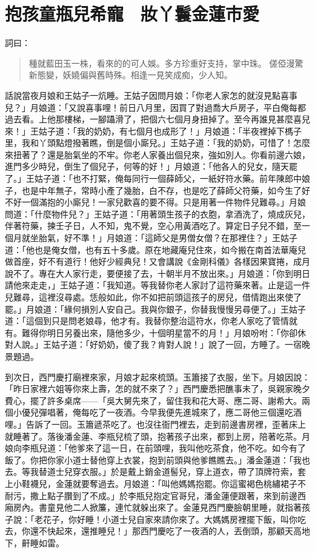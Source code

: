 
\chapter{抱孩童瓶兒希寵　妝丫鬟金蓮市愛}

詞曰：
\begin{quote}
種就藍田玉一株，看來的的可人娛。多方珍重好支持，掌中珠。
傞俹漫驚新態變，妖嬈偏與舊時殊。相逢一見笑成痴，少人知。
\end{quote}

話說當夜月娘和王姑子一炕睡。王姑子因問月娘：「你老人家怎的就沒見點喜事兒？」月娘道：「又說喜事哩！前日八月里，因買了對過喬大戶房子，平白俺每都過去看。上他那樓梯，一腳躡滑了，把個六七個月身扭掉了。至今再誰見甚麼喜兒來！」王姑子道：「我的奶奶，有七個月也成形了！」月娘道：「半夜裡掉下榪子里，我和丫頭點燈撥著瞧，倒是個小廝兒。」王姑子道：「我的奶奶，可惜了！怎麼來扭著了？還是胎氣坐的不牢。你老人家養出個兒來，強如別人。你看前邊六娘，進門多少時兒，倒生了個兒子，何等的好！」月娘道：「他各人的兒女，隨天罷了。」王姑子道：「也不打緊，俺每同行一個薛師父，一紙好符水藥。前年陳郎中娘子，也是中年無子，常時小產了幾胎，白不存，也是吃了薛師父符藥，如今生了好不好一個滿抱的小廝兒！一家兒歡喜的要不得。只是用著一件物件兒難尋。」月娘問道：「什麼物件兒？」王姑子道：「用著頭生孩子的衣胞，拿酒洗了，燒成灰兒，伴著符藥，揀壬子日，人不知，鬼不覺，空心用黃酒吃了。算定日子兒不錯，至一個月就坐胎氣，好不準！」月娘道：「這師父是男僧女僧？在那裡住？」王姑子道：「他也是俺女僧，也有五十多歲。原在地藏庵兒住來，如今搬在南首法華庵兒做首座，好不有道行！他好少經典兒！又會講說《金剛科儀》各樣因果寶捲，成月說不了。專在大人家行走，要便接了去，十朝半月不放出來。」月娘道：「你到明日請他來走走，」王姑子道：「我知道。等我替你老人家討了這符藥來著。止是這一件兒難尋，這裡沒尋處。恁般如此，你不如把前頭這孩子的房兒，借情跑出來使了罷。」月娘道：「緣何損別人安自己。我與你銀子，你替我慢慢另尋便了。」王姑子道：「這個到只是問老娘尋，他才有。我替你整治這符水，你老人家吃了管情就有。難得你明日另養出來，隨他多少，十個明星當不的月！」月娘吩咐：「你卻休對人說。」王姑子道：「好奶奶，傻了我？肯對人說！」說了一回，方睡了。一宿晚景題過。

到次日，西門慶打廟裡來家，月娘才起來梳頭。玉簫接了衣服，坐下。月娘因說：「昨日家裡六姐等你來上壽，怎的就不來了？」西門慶悉把醮事未了，吳親家晚夕費心，擺了許多桌席——「吳大舅先來了，留住我和花大哥、應二哥、謝希大。兩個小優兒彈唱著，俺每吃了一夜酒。今早我便先進城來了，應二哥他三個還吃酒哩。」告訴了一回。玉簫遞茶吃了。也沒往衙門裡去，走到前邊書房裡，歪著床上就睡著了。落後潘金蓮、李瓶兒梳了頭，抱著孩子出來，都到上房，陪著吃茶。月娘向李瓶兒道：「他爹來了這一日，在前頭哩，我叫他吃茶食，他不吃。如今有了飯了。你把你家小道士替他穿上衣裳，抱到前頭與他爹瞧瞧去。」潘金蓮道：「我也去。等我替道士兒穿衣服。」於是戴上銷金道髻兒，穿上道衣，帶了頂牌符索，套上小鞋襪兒，金蓮就要奪過去。月娘道：「叫他媽媽抱罷。你這蜜褐色桃繡裙子不耐污，撒上點子臢到了不成。」於李瓶兒抱定官哥兒，潘金蓮便跟著，來到前邊西廂房內。書童見他二人掀簾，連忙就躲出來了。金蓮見西門慶臉朝里睡，就指著孩子說：「老花子，你好睡！小道士兒自家來請你來了。大媽媽房裡擺下飯，叫你吃去，你還不快起來，還推睡兒！」那西門慶吃了一夜酒的人，丟倒頭，那顧天高地下，鼾睡如雷。

